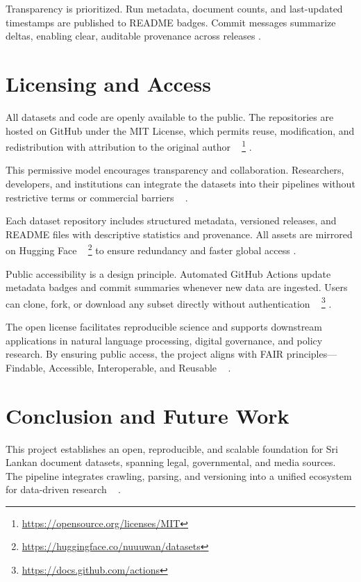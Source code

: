 \documentclass[10pt,a4paper]{article}%
\begin{document}
%
Transparency is prioritized. Run metadata, document counts, and last-updated timestamps are published to README badges. Commit messages summarize deltas, enabling clear, auditable provenance across releases .%

%
\section{Licensing and Access}%
\label{sec:LicensingandAccess}%
All datasets and code are openly available to
 the public. The repositories are hosted on
 GitHub under the MIT License, which permits
 reuse, modification, and redistribution with
 attribution to the original author%
~%
\footnote{\href{https://opensource.org/licenses/MIT}{https://opensource.org/licenses/MIT}}%
.%

%
This permissive model encourages transparency
 and collaboration. Researchers, developers, and
 institutions can integrate the datasets into
 their pipelines without restrictive terms or
 commercial barriers%
~%
\citep{OpenDataPractices2020}%
.%

%
Each dataset repository includes structured
 metadata, versioned releases, and README files
 with descriptive statistics and provenance.
 All assets are mirrored on Hugging Face%
~%
\footnote{\href{https://huggingface.co/nuuuwan/datasets}{https://huggingface.co/nuuuwan/datasets}}%
to ensure redundancy and faster global access .%

%
Public accessibility is a design principle.
 Automated GitHub Actions update metadata badges
 and commit summaries whenever new data are
 ingested. Users can clone, fork, or download
 any subset directly without authentication%
~%
\footnote{\href{https://docs.github.com/actions}{https://docs.github.com/actions}}%
.%

%
The open license facilitates reproducible
 science and supports downstream applications
 in natural language processing, digital
 governance, and policy research. By ensuring
 public access, the project aligns with FAIR
 principles—Findable, Accessible, Interoperable,
 and Reusable%
~%
\citep{FAIRPrinciples2016}%
.%

%
\section{Conclusion and Future Work}%
\label{sec:ConclusionandFutureWork}%
This project establishes an open, reproducible,
 and scalable foundation for Sri Lankan document
 datasets, spanning legal, governmental, and
 media sources. The pipeline integrates crawling,
 parsing, and versioning into a unified
 ecosystem for data-driven research%
~%
\citep{OpenDataPractices2020}%
.%
\end{document}
